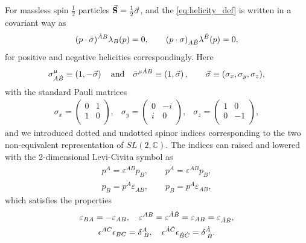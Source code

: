 For massless spin $\frac{1}{2}$ particles $\va{S} = \frac{1}{2}\va{\sigma}$, and 
the \cref{eq:helicity_def} is written in a covariant way as
\begin{equation}
  (\sp(p,\bar{\sigma}))^{\dot{A}B} \lambda_B(p) = 0, \qquad (\sp(p,\sigma))_{A\dot{B}} \lambda^{\dot{B}}(p) = 0,
\end{equation}
for positive and negative helicities correspondingly.
Here 
\begin{equation}
  \sigma_{A \dot{B}}^{\mu} \equiv  \left( 1 , - \vec{\sigma} \right) \qand \bar{\sigma}^{\mu \dot{A} B} \equiv  \left( 1 ,  \vec{\sigma} \right),
  \qquad \vec{\sigma}\equiv (\sigma_x,\sigma_y,\sigma_z),
\end{equation} 
with the standard Pauli matrices
\begin{eqnarray}
  \sigma_x = \left(\begin{array}{cc}
    0 & 1\\
    1 & 0 \\
  \end{array} \right),
  &
  \sigma_y = \left(\begin{array}{cc}
    0 & -i\\
    i & 0 \\
  \end{array} \right),
  &
  \sigma_z = \left(\begin{array}{cc}
    1 & 0\\
    0 & -1 \\
  \end{array} \right),
\end{eqnarray}
and we introduced dotted and undotted spinor indices corresponding to the two non-equivalent representation of $SL(2,\mathbb{C})$.
The indices can raised and lowered with the 2-dimensional Levi-Civita symbol as
\begin{equation}
    \label{raising_and_lowering_spinor_indices}
  \begin{gathered}
    p^A = \varepsilon^{AB} p_B, \qquad
    p^{\dot{A}} = \varepsilon^{\dot{A}\dot{B}} p_{\dot{B}}, \\
    p_{\dot{B}} = p^{\dot{A}} \varepsilon_{\dot{A}\dot{B}},  \qquad
    p_B = p^A \varepsilon_{AB},
  \end{gathered}
\end{equation}
which satisfies the properties
\begin{equation}
  \begin{gathered}
    \varepsilon_{BA} = - \varepsilon_{AB},  \quad   \varepsilon^{AB} = \varepsilon^{\dot{A}\dot{B}} = \varepsilon_{AB} = \varepsilon_{\dot{A}\dot{B}}, \\
    \epsilon^{A C} \epsilon_{B C} = \delta^{A}_{\;B}, \quad \epsilon^{\dot{A} \dot{C}} \epsilon_{\dot{B} \dot{C}} = \delta^{\dot{A}}_{\;\dot{B}}.
  \end{gathered}
\end{equation}
